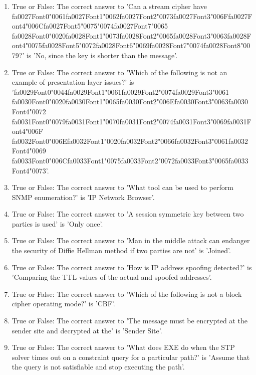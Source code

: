 \documentclass[12pt]{article}
\begin{document}
\begin{enumerate}[label=\arabic*.]
\item True or False: The correct answer to 'Can a stream cipher have {\csname fa0027Font0\endcsname\char"0061}{\csname fa0027Font1\endcsname\char"0062}{\csname fa0027Font2\endcsname\char"0073}{\csname fa0027Font3\endcsname\char"006F}{\csname fa0027Font4\endcsname\char"006C}{\csname fa0027Font5\endcsname\char"0075}{\char"0074}{\csname fa0027Font7\endcsname\char"0065} {\csname fa0028Font0\endcsname\char"0020}{\csname fa0028Font1\endcsname\char"0073}{\csname fa0028Font2\endcsname\char"0065}{\csname fa0028Font3\endcsname\char"0063}{\csname fa0028Font4\endcsname\char"0075}{\csname fa0028Font5\endcsname\char"0072}{\csname fa0028Font6\endcsname\char"0069}{\csname fa0028Font7\endcsname\char"0074}{\csname fa0028Font8\endcsname\char"0079}?' is 'No, since the key is shorter than the message'.
\item True or False: The correct answer to 'Which of the following is not an example of presentation layer issues?' is '{\csname fa0029Font0\endcsname\char"0044}{\csname fa0029Font1\endcsname\char"0061}{\csname fa0029Font2\endcsname\char"0074}{\csname fa0029Font3\endcsname\char"0061} {\csname fa0030Font0\endcsname\char"0020}{\csname fa0030Font1\endcsname\char"0065}{\csname fa0030Font2\endcsname\char"006E}{\csname fa0030Font3\endcsname\char"0063}{\csname fa0030Font4\endcsname\char"0072} {\csname fa0031Font0\endcsname\char"0079}{\csname fa0031Font1\endcsname\char"0070}{\csname fa0031Font2\endcsname\char"0074}{\csname fa0031Font3\endcsname\char"0069}{\csname fa0031Font4\endcsname\char"006F} {\csname fa0032Font0\endcsname\char"006E}{\csname fa0032Font1\endcsname\char"0020}{\csname fa0032Font2\endcsname\char"0066}{\csname fa0032Font3\endcsname\char"0061}{\csname fa0032Font4\endcsname\char"0069} {\csname fa0033Font0\endcsname\char"006C}{\csname fa0033Font1\endcsname\char"0075}{\csname fa0033Font2\endcsname\char"0072}{\csname fa0033Font3\endcsname\char"0065}{\csname fa0033Font4\endcsname\char"0073}'.
\item True or False: The correct answer to 'What tool can be used to perform SNMP enumeration?' is 'IP Network Browser'.
\item True or False: The correct answer to 'A session symmetric key between two parties is used' is 'Only once'.
\item True or False: The correct answer to 'Man in the middle attack can endanger the security of Diffie Hellman method if two parties are not' is 'Joined'.
\item True or False: The correct answer to 'How is IP address spoofing detected?' is 'Comparing the TTL values of the actual and spoofed addresses'.
\item True or False: The correct answer to 'Which of the following is not a block cipher operating mode?' is 'CBF'.
\item True or False: The correct answer to 'The message must be encrypted at the sender site and decrypted at the' is 'Sender Site'.
\item True or False: The correct answer to 'What does EXE do when the STP solver times out on a constraint query for a particular path?' is 'Assume that the query is not satisfiable and stop executing the path'.
\end{enumerate}
\end{document}
